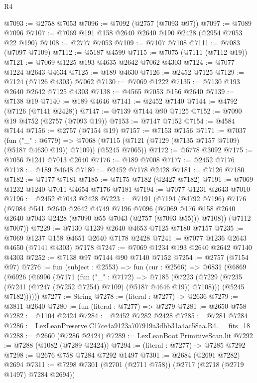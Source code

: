 \begin{lexlean}{R4}
\begin{coremodule}
@7093 := @2758 @7053
@7096 := @7092 (@2757 (@7093 @97))
@7097 := @7089 @7096
@7107 := @7069 @191 @158 @2640 @2640 @190 @2428 (@2954 @7053 @22 @190)
@7108 := @2777 @7053
@7109 := @7107 @7108
@7111 := @7083 (@7097 @7109)
@7112 := @5187 @4599
@7115 := @7075 (@7111 (@7112 @19))
@7121 := @7069 @1225 @193 @4635 @2642 @7062 @4303
@7124 := @7077 @1224 @2643 @4634
@7125 := @189 @4630
@7126 := @2452 @7125
@7129 := @7124 (@7126 @4303) @7062
@7130 := @7069 @1222
@7135 := @7130 @193 @2640 @2642 @7125 @4303
@7138 := @4565 @7053 @156 @2640
@7139 := @7138 @19
@7140 := @189 @4646
@7141 := @2452 @7140
@7144 := @4792 (@7126 (@7141 @2428))
@7147 := @7139 @7144 @90 @7125
@7152 := @7090 @19 @4752 (@2757 (@7093 @19))
@7153 := @7147 @7152
@7154 := @4584 @7144
@7156 := @2757 (@7154 @19)
@7157 := @7153 @7156
@7171 := @7037
    (fun ("_" : @6779) =>
    @7068 (@7115 (@7121 (@7129 (@7135 @7157 @7109) (@5187 @4630 @19)) @7109)) (@5245 @7065))
@7172 := @6778 @3092
@7175 := @7056 @1241 @7013 @2640
@7176 := @189 @7008
@7177 := @2452 @7176
@7178 := @189 @4648
@7180 := @2452 @7178 @2428
@7181 := @7126 @7180
@7182 := @7177 @7181
@7185 := @7175 @7182 (@2427 @7182)
@7191 := @7069 @1232 @1240 @7011 @4654 @7176 @7181
@7194 := @7077 @1231 @2643 @7010
@7196 := @2452 @7043 @2428
@7223 := @7191
    (@7194
      (@4792 @7196)
      @7176
      (@7084
        @541
        @2640
        @2642
        @4749
        @7196
        @7096
        (@7069 @176 @158 @2640 @2640 @7043 @2428 (@7090 @55 @7043 (@2757 (@7093 @55))) @7108))
      (@7112 @7007))
@7229 := @7130 @1239 @2640 @4653 @7125 @7180 @7157
@7235 := @7069 @1237 @158 @4651 @2640 @7178 @2428
@7241 := @7077 @1236 @2643 @4650 (@7141 @4303) @7178
@7247 := @7069 @1234 @193 @2640 @2642 @7140 @4303
@7252 := @7138 @97 @7144 @90 @7140 @7152
@7254 := @2757 (@7154 @97)
@7276 := fun (subject : @2553) =>
  fun (cur : @2566) =>
  @6831
    (@6869
      (@6926
        (@6996
          (@7171
            (fun ("_" : @7172) =>
            @7185
              (@7223 (@7229 (@7235 (@7241 (@7247 (@7252 @7254) @7109) (@5187 @4646 @19)) @7108)))
              (@5245 @7182))))))
@7277 := String
@7278 := (literal : @7277) -> @2636
@7279 := @3811 @2640
@7280 := fun (literal : @7277) => @7279
@7281 := @2650 @758
@7282 := @1104 @2424
@7284 := @2452 @7282 @2428
@7285 := @7281 @7284
@7286 := LexLeanPreserve.C17ce4a9123a707919a3dbb31a4ac58aa.R4.__fits_18
@7288 := @2660 (@7286 @2424)
@7289 := LexLeanBoot.PrimitiveScan.lit
@7292 := @7288 (@1082 (@7289 @2424))
@7294 := (literal : @7277) -> @7285 @7292
@7298 := @2676 @758 @7284 @7292 @1497
@7301 := @2684 (@2691 @7282) @2694
@7311 := @7298 @7301 (@2701 (@2711 @758)) (@2717 (@2718 (@2719 @1497) @7284 @2694))

\end{coremodule}
\end{lexlean}
